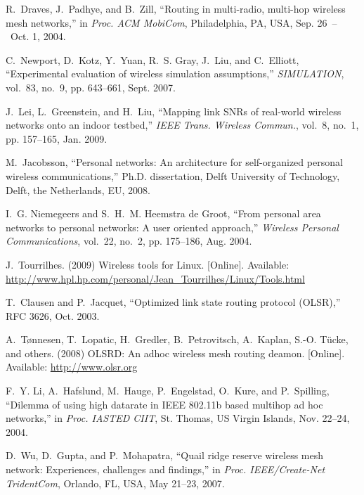 \documentclass[11pt,draftclsnofoot,journal,onecolumn]{IEEEtran}
\begin{document}
\begin{thebibliography}{10}
R.~{Draves}, J.~{Padhye}, and B.~{Zill}, ``Routing in multi-radio, multi-hop
  wireless mesh networks,'' in \emph{Proc. ACM MobiCom}, Philadelphia, PA, USA,
  Sep. 26~--~Oct. 1, 2004.

C.~{Newport}, D.~{Kotz}, Y.~{Yuan}, R.~S. {Gray}, J.~{Liu}, and C.~{Elliott},
  ``Experimental evaluation of wireless simulation assumptions,''
  \emph{SIMULATION}, vol.~83, no.~9, pp. 643--661, Sept. 2007.

J.~{Lei}, L.~{Greenstein}, and H.~{Liu}, ``Mapping link {SNRs} of real-world
  wireless networks onto an indoor testbed,'' \emph{{IEEE} Trans. Wireless
  Commun.}, vol.~8, no.~1, pp. 157--165, Jan. 2009.

M.~Jacobsson, ``Personal networks: An architecture for self-organized personal
  wireless communications,'' Ph.D. dissertation, Delft University of
  Technology, Delft, the Netherlands, EU, 2008.

I.~G. {Niemegeers} and S.~H.~M. {Heemstra de Groot}, ``From personal area
  networks to personal networks: A user oriented approach,'' \emph{Wireless
  Personal Communications}, vol.~22, no.~2, pp. 175--186, Aug. 2004.

\BIBentryALTinterwordspacing
J.~Tourrilhes. (2009) Wireless tools for {Linux}. [Online]. Available:
  \url{http://www.hpl.hp.com/personal/Jean_Tourrilhes/Linux/Tools.html}
\BIBentrySTDinterwordspacing

T.~{Clausen} and P.~{Jacquet}, ``Optimized link state routing protocol
  ({OLSR}),'' RFC 3626, Oct. 2003.

\BIBentryALTinterwordspacing
A.~{T\o nnesen}, T.~{Lopatic}, H.~{Gredler}, B.~{Petrovitsch}, A.~{Kaplan},
  S.-O. {T\"{u}cke}, and {others}. (2008) {OLSRD}: An adhoc wireless mesh
  routing deamon. [Online]. Available: \url{http://www.olsr.org}
\BIBentrySTDinterwordspacing

F.~Y. {Li}, A.~{Hafslund}, M.~{Hauge}, P.~{Engelstad}, O.~{Kure}, and
  P.~{Spilling}, ``Dilemma of using high datarate in {IEEE} 802.11b based
  multihop ad hoc networks,'' in \emph{Proc. IASTED CIIT}, St. Thomas, US
  Virgin Islands, Nov. 22--24, 2004.

D.~{Wu}, D.~{Gupta}, and P.~{Mohapatra}, ``Quail ridge reserve wireless mesh
  network: Experiences, challenges and findings,'' in \emph{Proc.
  IEEE/Create-Net TridentCom}, Orlando, FL, USA, May 21--23, 2007.

\end{thebibliography}
\end{document}

